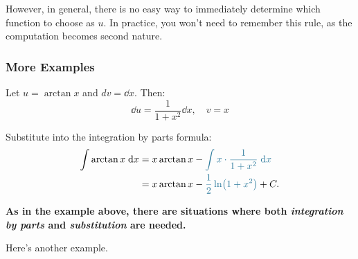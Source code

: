 However, in general, there is no easy way to immediately determine which function to choose as $u$. In practice, you won't need to remember this rule, as the computation becomes second nature.



\subsubsection{More Examples}
\begin{ex}
    Let $ u = \arctan x $ and $ dv = \dd x $. Then:
\[
\dd u = \dfrac{1}{1+x^2} \dd x, \quad v = x
\]

Substitute into the integration by parts formula:
\begin{align*}
    \int \arctan x \dd x &= x \arctan x - \blue{\int x \cdot \dfrac{1}{1+x^2} \dd x} \\
    &= x \arctan x - \blue{\dfrac{1}{2} \ln(1+x^2)} + C.
\end{align*}

\end{ex}

\textbf{As in the example above, there are situations where both \textit{integration by parts} and \textit{substitution} are needed.}

\begin{comment}
    \begin{ex}[Evaluate  $\dint x e^x \dd x$]
    Take $u = x$ and $dv = e^x \dd x$. Then:
    \begin{align*}
        \int x e^x \dd x &= x e^x - \int e^x \dd x \\
        &= x e^x - e^x + C \\
        &= e^x (x - 1) + C.
    \end{align*}
\end{ex}
\end{comment}
Here's another example.

